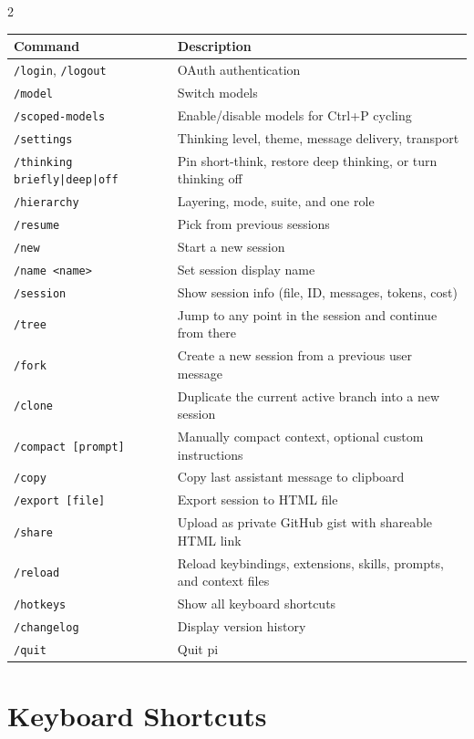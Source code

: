 \documentclass[12pt]{article}
\begin{document}
\begin{multicols}{2}
\begin{tabular}{@{}ll@{}}
\toprule
\textbf{Command} & \textbf{Description} \\
\midrule
\texttt{/login}, \texttt{/logout} & OAuth authentication \\
\texttt{/model} & Switch models \\
\texttt{/scoped-models} & Enable/disable models for Ctrl+P cycling \\
\texttt{/settings} & Thinking level, theme, message delivery, transport \\
\texttt{/thinking briefly|deep|off} & Pin short-think, restore deep thinking, or turn thinking off \\
\texttt{/hierarchy} & Layering, mode, suite, and one role \\
\texttt{/resume} & Pick from previous sessions \\
\texttt{/new} & Start a new session \\
\texttt{/name <name>} & Set session display name \\
\texttt{/session} & Show session info (file, ID, messages, tokens, cost) \\
\texttt{/tree} & Jump to any point in the session and continue from there \\
\texttt{/fork} & Create a new session from a previous user message \\
\texttt{/clone} & Duplicate the current active branch into a new session \\
\texttt{/compact [prompt]} & Manually compact context, optional custom instructions \\
\texttt{/copy} & Copy last assistant message to clipboard \\
\texttt{/export [file]} & Export session to HTML file \\
\texttt{/share} & Upload as private GitHub gist with shareable HTML link \\
\texttt{/reload} & Reload keybindings, extensions, skills, prompts, and context files \\
\texttt{/hotkeys} & Show all keyboard shortcuts \\
\texttt{/changelog} & Display version history \\
\texttt{/quit} & Quit pi \\
\bottomrule
\end{tabular}
\end{multicols}

\section{Keyboard Shortcuts}
\end{document}

